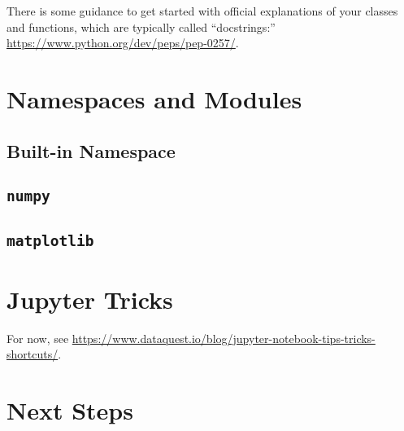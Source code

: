 \documentclass[11pt]{article}
\begin{document}
There is some guidance to get started with official explanations of your classes and functions, which are typically called ``docstrings:'' \url{https://www.python.org/dev/peps/pep-0257/}.

\section{Namespaces and Modules}

	\subsection{Built-in Namespace}

	\subsection{\texttt{numpy}}
	
	\subsection{\texttt{matplotlib}}
	
	
\section{Jupyter Tricks}

For now, see \url{https://www.dataquest.io/blog/jupyter-notebook-tips-tricks-shortcuts/}.

\section{Next Steps}	

%
\end{document}
